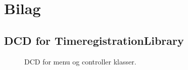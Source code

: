 \newpage
\section{Bilag}
\subsection{DCD for TimeregistrationLibrary}

\begin{sidewaysfigure}
    \caption{DCD for menu og controller klasser.}
    \label{fig:DCDLib}
\end{sidewaysfigure}